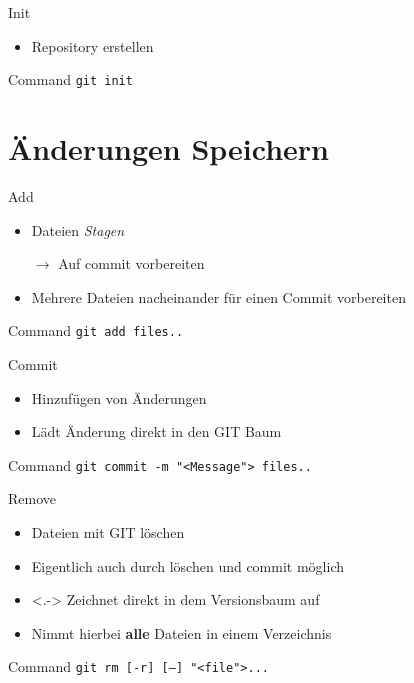 \documentclass{beamer}
\begin{document}
    \begin{frame}{Init}
      \begin{itemize}
        \item Repository erstellen
      \end{itemize}
      \begin{block}{Command}
        \texttt{git init}
      \end{block}
    \end{frame}

    \section[Ändern]{Änderungen Speichern}

    \begin{frame}{Add}
      \begin{itemize}[<+->]
        \item Dateien \textit{Stagen}
        \item[$\rightarrow$] Auf commit vorbereiten
        \item Mehrere Dateien nacheinander für einen Commit vorbereiten
      \end{itemize}
      \begin{block}{Command}
        \texttt{git add files..}
      \end{block}
    \end{frame}

    \begin{frame}{Commit}
      \begin{itemize}
        \item Hinzufügen von Änderungen
        \item Lädt Änderung direkt in den GIT Baum
      \end{itemize}
      \begin{block}{Command}
        \texttt{git commit -m "<Message"> files..}
      \end{block}
    \end{frame}

    \begin{frame}{Remove}
      \begin{itemize}
        \item Dateien mit GIT löschen
        \item<+-> Eigentlich auch durch löschen und commit möglich
        \item<.-> Zeichnet direkt in dem Versionsbaum auf
        \item<+-|@alert> [-r] Nimmt hierbei \textbf{alle} Dateien in einem Verzeichnis
      \end{itemize}
      \begin{block}{Command}
        \texttt{git rm [-r] [--] "<file">...}
      \end{block}
    \end{frame}
\end{document}
